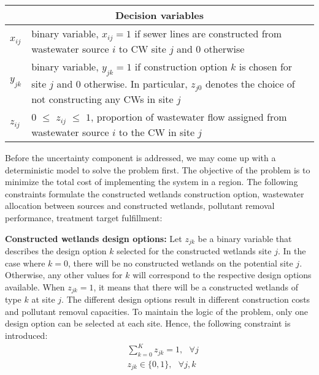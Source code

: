 \documentclass[preprint,12pt,authoryear]{elsarticle}
\begin{document}
\begin{table}[!htpb]
\begin{tabular}{|p{1.5cm} p{16cm}|}
		\hline
		\multicolumn{2}{|c|}{Decision variables}\\
		\hline	
		$x_{ij}$ & binary variable, $x_{ij}=1$ if sewer lines are constructed from wastewater source $i$ to CW site $j$ and $0$ otherwise\\
		$y_{jk}$ & binary variable, $y_{jk}=1$ if construction option $k$ is chosen for site $j$ and $0$ otherwise. In particular, $z_{j0}$ denotes the choice of not constructing any CWs in site $j$\\
		$z_{ij}$ & $0$ $\leq$ $z_{ij}$ $\leq$ $1$, proportion of wastewater flow assigned from wastewater source $i$ to the CW in site $j$ \\
		\hline	
	\end{tabular}

	\label{table:modelparameter}
\end{table}

Before the uncertainty component is addressed, we may come up with a deterministic model to solve the problem first. The objective of the problem is to minimize the total cost of implementing the system in a region. The following constraints formulate the constructed wetlands construction option, wastewater allocation between sources and constructed wetlands, pollutant removal performance, treatment target fulfillment:

\textbf{Constructed wetlands design options:} Let $z_{jk}$ be a binary variable that describes the design option $k$ selected for the constructed wetlands site $j$. In the case where $k=0$, there will be no constructed wetlands on the potential site $j$. Otherwise, any other values for $k$ will correspond to the respective design options available. When $z_{jk} = 1$, it means that there will be a constructed wetlands of type $k$ at site $j$. The different design options result in different construction costs and pollutant removal capacities. To maintain the logic of the problem, only one design option can be selected at each site. Hence, the following constraint is introduced:
\begin{equation*}
	\begin{split}
	&\sum_{k=0}^{K}z_{jk}=1,~~~\forall j\\
	&z_{jk}\in\{0,1\},~~~\forall j,k
	\end{split}
\end{equation*}
\end{document}
